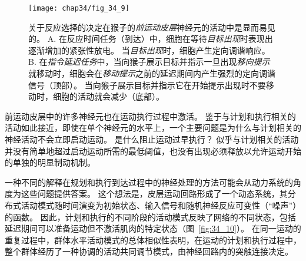 \begin{figure}[htbp]
	\centering
	\texttt{[image: chap34/fig\_34\_9]}
	\caption{关于反应选择的决定在猴子的\textit{前运动皮层}神经元的活动中是显而易见的\cite{crammond2000prior}。
		A. 在反应时间任务（到达）中，细胞在等待\textit{目标出现}时表现出逐渐增加的紧张性放电。
		当\textit{目标出现}时，细胞产生定向调谐响应。
		B. 在\textit{指令延迟任务}中，当向猴子展示目标并指示一旦出现\textit{移向提示}就移动时，细胞会在\textit{移动提示}之前的延迟期间内产生强烈的定向调谐信号（顶部）。
		当向猴子展示目标并指示它在开始提示出现时不要移动时，细胞的活动就会减少（底部）。}
	\label{fig:34_9}
\end{figure}


前运动皮层中的许多神经元也在运动执行过程中激活。
鉴于与计划和执行相关的活动如此接近，即使在单个神经元的水平上，一个主要问题是为什么与计划相关的神经活动不会立即启动运动。
是什么阻止运动过早执行？
似乎与计划相关的活动并没有简单地超过启动运动所需的最低阈值，也没有出现必须释放以允许运动开始的单独的明显制动机制。


一种不同的解释在规划和执行到达过程中的神经处理的方法可能会从动力系统的角度为这些问题提供答案。
这个想法是，皮层运动回路形成了一个动态系统，其分布式活动模式随时间演变为初始状态、输入信号和随机神经反应可变性（“噪声”）的函数。
因此，计划和执行的不同阶段的活动模式反映了网络的不同状态，包括延迟期间可以准备运动但不激活肌肉的特定状态（图~\ref{fig:34_10}）。
在同一运动的重复过程中，群体水平活动模式的总体相似性表明，在运动的计划和执行过程中，整个群体经历了一种协调的活动共同调节模式，由神经回路内的突触连接决定。


